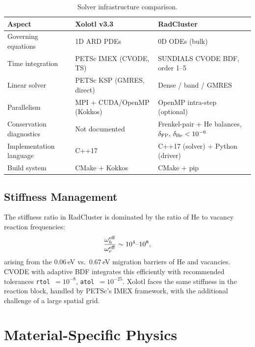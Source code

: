 \documentclass[12pt,letterpaper]{article}
\begin{document}
\begin{table}[htbp]
\centering
\caption{Solver infrastructure comparison.}
\label{tab:solver}
\renewcommand{\arraystretch}{1.2}
\begin{tabular}{@{}L{3.8cm} L{4.7cm} L{4.7cm}@{}}
\toprule
\textbf{Aspect}
  & \textbf{Xolotl v3.3}
  & \textbf{RadCluster} \\
\midrule
Governing equations & 1D ARD PDEs & 0D ODEs (bulk) \\
Time integration & PETSc IMEX (CVODE, TS) & SUNDIALS CVODE BDF, order 1--5 \\
Linear solver & PETSc KSP (GMRES, direct) & Dense / band / GMRES \\
Parallelism & MPI + CUDA/OpenMP (Kokkos) & OpenMP intra-step (optional) \\
Conservation diagnostics & Not documented & Frenkel-pair + He balances,
  $\delta_{\rm FP},\,\delta_{\rm He} < 10^{-6}$ \\
Implementation language & C++17 & C++17 (solver) + Python (driver) \\
Build system & CMake + Kokkos & CMake + pip \\
\bottomrule
\end{tabular}
\end{table}

\subsection{Stiffness Management}

The stiffness ratio in RadCluster is dominated by the ratio of He to
vacancy reaction frequencies:
\begin{equation}
  \frac{\omega_h^{\rm eff}}{\omega_v^{\rm eff}} \sim 10^4\text{--}10^8,
\end{equation}
arising from the 0.06\,eV vs.\ 0.67\,eV migration barriers of He and
vacancies.  CVODE with adaptive BDF integrates this efficiently with
recommended tolerances \texttt{rtol}~$= 10^{-8}$,
\texttt{atol}~$= 10^{-25}$.  Xolotl faces the same stiffness in the
reaction block, handled by PETSc's IMEX framework, with the additional
challenge of a large spatial grid.

\section{Material-Specific Physics}
\label{sec:material}
\end{document}
